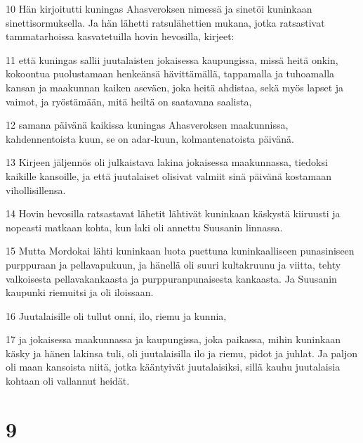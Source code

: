 \par 10 Hän kirjoitutti kuningas Ahasveroksen nimessä ja sinetöi kuninkaan sinettisormuksella. Ja hän lähetti ratsulähettien mukana, jotka ratsastivat tammatarhoissa kasvatetuilla hovin hevosilla, kirjeet:
\par 11 että kuningas sallii juutalaisten jokaisessa kaupungissa, missä heitä onkin, kokoontua puolustamaan henkeänsä hävittämällä, tappamalla ja tuhoamalla kansan ja maakunnan kaiken aseväen, joka heitä ahdistaa, sekä myös lapset ja vaimot, ja ryöstämään, mitä heiltä on saatavana saalista,
\par 12 samana päivänä kaikissa kuningas Ahasveroksen maakunnissa, kahdennentoista kuun, se on adar-kuun, kolmantenatoista päivänä.
\par 13 Kirjeen jäljennös oli julkaistava lakina jokaisessa maakunnassa, tiedoksi kaikille kansoille, ja että juutalaiset olisivat valmiit sinä päivänä kostamaan vihollisillensa.
\par 14 Hovin hevosilla ratsastavat lähetit lähtivät kuninkaan käskystä kiiruusti ja nopeasti matkaan kohta, kun laki oli annettu Suusanin linnassa.
\par 15 Mutta Mordokai lähti kuninkaan luota puettuna kuninkaalliseen punasiniseen purppuraan ja pellavapukuun, ja hänellä oli suuri kultakruunu ja viitta, tehty valkoisesta pellavakankaasta ja purppuranpunaisesta kankaasta. Ja Suusanin kaupunki riemuitsi ja oli iloissaan.
\par 16 Juutalaisille oli tullut onni, ilo, riemu ja kunnia,
\par 17 ja jokaisessa maakunnassa ja kaupungissa, joka paikassa, mihin kuninkaan käsky ja hänen lakinsa tuli, oli juutalaisilla ilo ja riemu, pidot ja juhlat. Ja paljon oli maan kansoista niitä, jotka kääntyivät juutalaisiksi, sillä kauhu juutalaisia kohtaan oli vallannut heidät.

\chapter{9}

